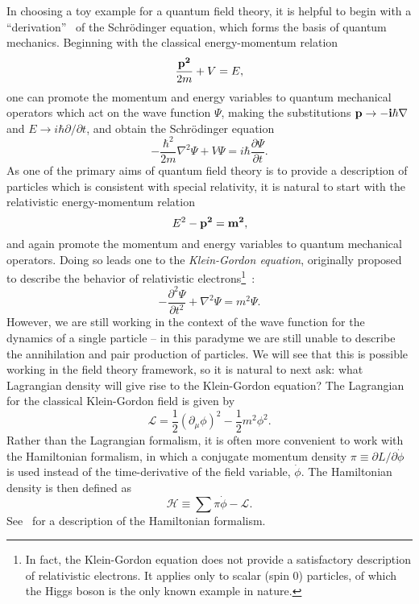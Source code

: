 In choosing a toy example for a quantum field theory, it is helpful to begin with a ``derivation''~\cite{Griffiths:2008zz} of the Schr{\"o}dinger equation, which forms the basis of quantum mechanics.
Beginning with the classical energy-momentum relation
\begin{equation}
    \frac{\bf{p}^2}{2m} + V = E,
\end{equation}
one can promote the momentum and energy variables to quantum mechanical operators which act on the wave function $\Psi$, making the substitutions $\bf{p} \to -i\hbar\nabla$ and $E \to i\hbar \partial/\partial t$, and obtain the Schr{\"o}dinger equation
\begin{equation}
    - \frac{\hbar^2}{2m} \nabla^2 \Psi + V \Psi = i\hbar \frac{\partial \Psi}{\partial t}.
\end{equation}
As one of the primary aims of quantum field theory is to provide a description of particles which is consistent with special relativity, it is natural to start with the relativistic energy-momentum relation
\begin{equation}
    E^2 - \bf{p}^2 = m^2,
\end{equation}
and again promote the momentum and energy variables to quantum mechanical operators.
Doing so leads one to the \emph{Klein-Gordon equation}, originally proposed to describe the behavior of relativistic electrons\footnote{In fact, the Klein-Gordon equation does not provide a satisfactory description of relativistic electrons. It applies only to scalar (spin 0) particles, of which the Higgs boson is the only known example in nature.}~\cite{Klein:kge,Gordon:kge}:
\begin{equation}
    -\frac{\partial^2 \Psi}{\partial t^2} + \nabla^2 \Psi = m^2 \Psi.
\end{equation}
However, we are still working in the context of the wave function for the dynamics of a single particle -- in this paradyme we are still unable to describe the annihilation and pair production of particles.
We will see that this is possible working in the field theory framework, so it is natural to next ask: what Lagrangian density will give rise to the Klein-Gordon equation?
The Lagrangian for the classical Klein-Gordon field is given by
\begin{equation} \label{eqn:classical_kg}
    \mathcal L = \frac{1}{2} (\partial_\mu \phi)^2 - \frac{1}{2} m^2 \phi^2.
\end{equation}
Rather than the Lagrangian formalism, it is often more convenient to work with the Hamiltonian formalism, in which a conjugate momentum density $\pi \equiv \partial L/\partial \dot{\phi}$ is used instead of the time-derivative of the field variable, $\dot{\phi}$.
The Hamiltonian density is then defined as
\begin{equation}
    \mathcal H \equiv \sum \pi \dot{\phi} - \mathcal L.
\end{equation}
See~\cite{Fetter:cm} for a description of the Hamiltonian formalism. 


